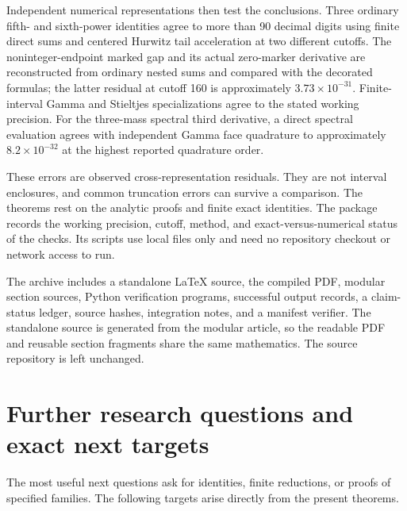 Independent numerical representations then test the conclusions.
Three ordinary fifth- and sixth-power identities agree to more than
90 decimal digits using finite direct sums and centered Hurwitz tail
acceleration at two different cutoffs. The noninteger-endpoint marked
gap and its actual zero-marker derivative are reconstructed from
ordinary nested sums and compared with the decorated formulas; the
latter residual at cutoff 160 is approximately $3.73\times10^{-31}$.
Finite-interval Gamma and Stieltjes specializations agree to the stated
working precision. For the three-mass spectral third derivative, a
direct spectral evaluation agrees with independent Gamma face
quadrature to approximately $8.2\times10^{-32}$ at the highest
reported quadrature order.

These errors are observed cross-representation residuals. They are not
interval enclosures, and common truncation errors can survive a
comparison. The theorems rest on the analytic proofs and finite exact
identities. The package records the working precision, cutoff, method,
and exact-versus-numerical status of the checks. Its scripts use local
files only and need no repository checkout or network access to run.

The archive includes a standalone \LaTeX{} source, the compiled PDF,
modular section sources, Python verification programs, successful output
records, a claim-status ledger, source hashes, integration notes, and a
manifest verifier. The standalone source is generated from the modular
article, so the readable PDF and reusable section fragments share the
same mathematics. The source repository is left unchanged.

\section{Further research questions and exact next targets}
\label{sec:research}

The most useful next questions ask for identities, finite reductions,
or proofs of specified families. The following targets arise directly
from the present theorems.


